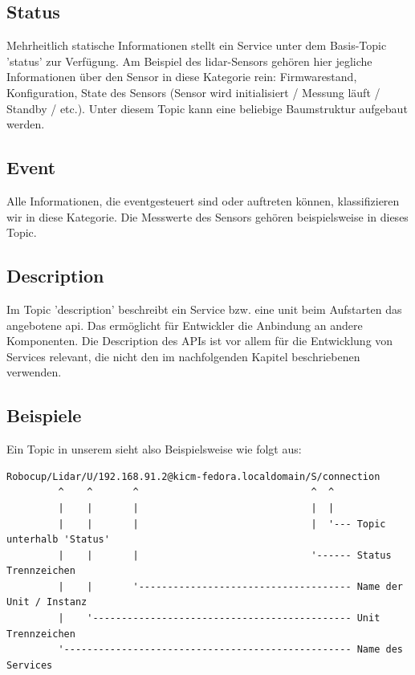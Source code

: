 \subsection{Status}
Mehrheitlich statische Informationen stellt ein Service unter dem Basis-Topic '\gls{status}' zur Verfügung. Am Beispiel des \acrshort{lidar}-Sensors gehören hier jegliche Informationen über den Sensor in diese Kategorie rein: Firmwarestand, Konfiguration, State des Sensors (Sensor wird initialisiert / Messung läuft / Standby / etc.). Unter diesem Topic kann eine beliebige Baumstruktur aufgebaut werden.

\subsection{Event}
Alle Informationen, die eventgesteuert sind oder auftreten können, klassifizieren wir in diese Kategorie. Die Messwerte des Sensors gehören beispielsweise in dieses Topic.

\subsection{Description}
Im Topic '\gls{description}' beschreibt ein Service bzw. eine \acrshort{unit} beim Aufstarten das angebotene \acrshort{api}. Das ermöglicht für Entwickler die Anbindung an andere Komponenten. Die Description des APIs ist vor allem für die Entwicklung von Services relevant, die nicht den im nachfolgenden Kapitel beschriebenen  verwenden.

\subsection{Beispiele}
Ein Topic in unserem sieht also Beispielsweise wie folgt aus:

\begin{minipage}{\linewidth}
\begin{verbatim}
Robocup/Lidar/U/192.168.91.2@kicm-fedora.localdomain/S/connection
         ^    ^       ^                              ^  ^
         |    |       |                              |  |
         |    |       |                              |  '--- Topic unterhalb 'Status'
         |    |       |                              '------ Status Trennzeichen
         |    |       '------------------------------------- Name der Unit / Instanz
         |    '--------------------------------------------- Unit Trennzeichen
         '-------------------------------------------------- Name des Services
\end{verbatim}
\end{minipage}

